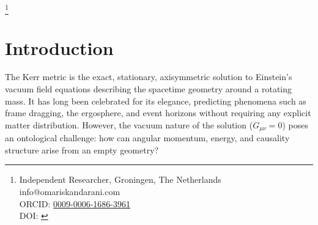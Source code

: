 \documentclass[twocolumn,aps,pre,floatfix,nofootinbib]{revtex4-2}
\begin{document}
    \title{\papertitle}
    \author{Omar Iskandarani}
    \thanks{Independent Researcher, Groningen, The Netherlands\\
    info@omariskandarani.com \\
    ORCID: \href{https://orcid.org/0009-0006-1686-3961}{0009-0006-1686-3961} \\
    DOI: \href{https://doi.org/\paperdoi}{\paperdoi}}
    \date{\today}

    \begin{abstract}
        \vspace*{-0.5em}
        \section*{\centering Abstract}
        \vspace*{-1em}

We reinterpret the Kerr solution of general relativity through the framework of the Vortex Æther Model (VAM), replacing spacetime curvature and singularities with structured swirl fields in an inviscid, incompressible medium. The Kerr frame-dragging term \(g_{t\phi}\) is shown to emerge naturally from the circulation \( \Gamma\) of an axisymmetric vortex ring, yielding a new expression: \(\g_{t\phi}^{(\text{VAM})} \sim -\frac{\Gamma}{C_e^2}\)

This correspondence allows us to model the rotating gravitational field of a compact object as a physical æther vortex with well-defined energy, swirl, and pressure gradients. We compare the VAM tensor formulation to the Einstein tensor of the Kerr metric and establish the conditions under which they produce similar observational effects. This work extends prior VAM formulations
 \cite{VAM-0,VAM-1,VAM-2,VAM-4,VAM-6}.

    \end{abstract}
    \maketitle


    \section{Introduction}

    The Kerr metric \cite{Kerr1963} is the exact, stationary, axisymmetric solution to Einstein's vacuum field equations describing the spacetime geometry around a rotating mass. It has long been celebrated for its elegance, predicting phenomena such as frame dragging, the ergosphere, and event horizons without requiring any explicit matter distribution. However, the vacuum nature of the solution ($G_{\mu\nu} = 0$) poses an ontological challenge: how can angular momentum, energy, and causality structure arise from an empty geometry?
\end{document}
